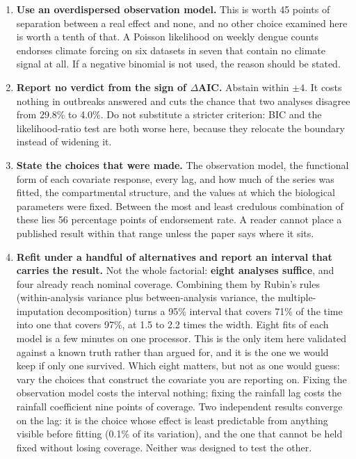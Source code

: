 \documentclass[11pt,a4paper]{article}
\begin{document}
\begin{enumerate}
\item \textbf{Use an overdispersed observation model.} This is worth 45 points of
      separation between a real effect and none, and no other choice examined here
      is worth a tenth of that. A Poisson likelihood on weekly dengue counts
      endorses climate forcing on six datasets in seven that contain no climate
      signal at all. If a negative binomial is not used, the reason should be
      stated.
\item \textbf{Report no verdict from the sign of $\Delta$AIC.} Abstain within
      $\pm 4$. It costs nothing in outbreaks answered and cuts the chance that
      two analyses disagree from 29.8\% to 4.0\%. Do not substitute a stricter
      criterion: BIC and the likelihood-ratio test are both worse here, because
      they relocate the boundary instead of widening it.
\item \textbf{State the choices that were made.} The observation model, the
      functional form of each covariate response, every lag, and how much of the
      series was fitted, the compartmental structure, and the values at which the
      biological parameters were fixed. Between the most and least credulous
      combination of these lies 56 percentage points of endorsement rate. A reader
      cannot place a published result within that range unless the paper says
      where it sits.
\item \textbf{Refit under a handful of alternatives and report an interval that
      carries the result.} Not the whole factorial: \textbf{eight analyses
      suffice}, and four already reach nominal coverage. Combining them by Rubin's
      rules (within-analysis variance plus between-analysis variance, the
      multiple-imputation decomposition) turns a 95\% interval that covers 71\%
      of the time into one that covers 97\%, at 1.5 to 2.2 times the width. Eight
      fits of each model is a few minutes on one processor. This is the only item
      here validated against a known truth rather than argued for, and it is the
      one we would keep if only one survived. Which eight matters, but not as
      one would guess: vary the choices that construct the covariate you are
      reporting on. Fixing the observation model costs the interval nothing;
      fixing the rainfall lag costs the rainfall coefficient nine points of
      coverage. Two independent results converge on the lag: it is the choice
      whose effect is least predictable from anything visible before fitting
      (0.1\% of its variation), and the one that cannot be held fixed without
      losing coverage. Neither was designed to test the other.
\end{enumerate}
\end{document}
